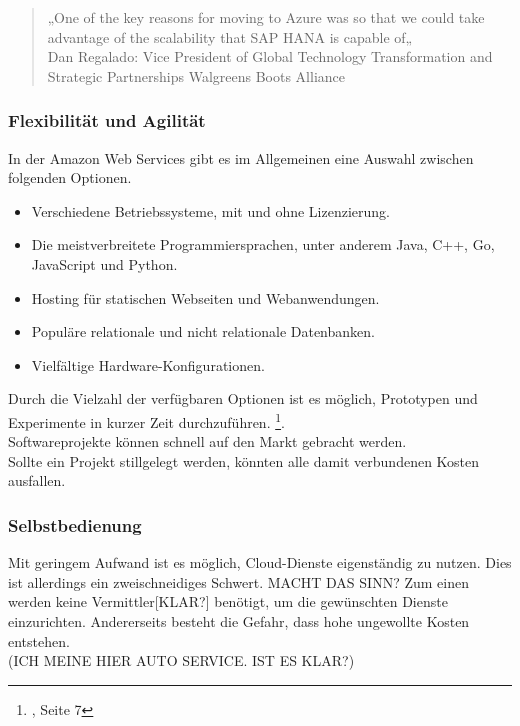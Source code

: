 \begin{quote}
      „One of the key reasons for moving to Azure was so that we could take advantage of the scalability that SAP HANA is capable of„
      \\
      Dan Regalado: Vice President of Global Technology Transformation and Strategic Partnerships Walgreens Boots Alliance
            {\cite{AZU01}}
\end{quote}

\subsubsection{Flexibilität und Agilität}
In der Amazon Web Services gibt es im Allgemeinen eine Auswahl zwischen folgenden Optionen.
\begin{itemize}
      \item
            Verschiedene Betriebssysteme, mit und ohne Lizenzierung.
      \item
            Die meistverbreitete Programmiersprachen, unter anderem Java, C++, Go, JavaScript und Python.{\cite{AMZ03}}

      \item
            Hosting für statischen Webseiten und Webanwendungen.
            {\cite{AMZ04}}

      \item
            Populäre relationale und nicht relationale Datenbanken.
            {\cite{AMZ10}}
      \item
            Vielfältige Hardware-Konfigurationen.

\end{itemize}
\begin{flushleft}
      Durch die Vielzahl der verfügbaren Optionen ist es möglich, Prototypen und Experimente in kurzer Zeit durchzuführen.
      \footnote{{\cite{IDC01}}, Seite 7}.
      \\
      Softwareprojekte können schnell auf den Markt gebracht werden. 
      \\
      Sollte ein Projekt stillgelegt werden, könnten alle damit verbundenen Kosten ausfallen.
\end{flushleft}

\subsubsection{Selbstbedienung}
Mit geringem Aufwand ist es möglich, Cloud-Dienste eigenständig zu nutzen. Dies ist allerdings ein zweischneidiges Schwert.
MACHT DAS SINN?
Zum einen werden keine Vermittler[KLAR?] benötigt, um die gewünschten Dienste einzurichten. Andererseits besteht die Gefahr, dass hohe ungewollte Kosten entstehen.
\\ (ICH MEINE HIER AUTO SERVICE. IST ES KLAR?)


